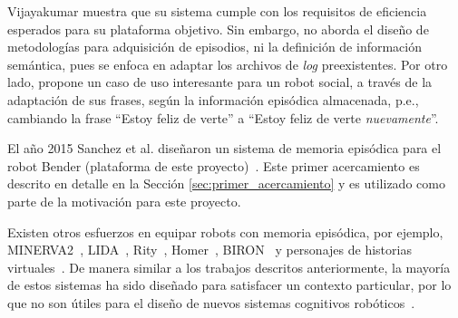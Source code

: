 Vijayakumar muestra que su sistema cumple con los requisitos de eficiencia esperados para su plataforma objetivo. Sin embargo, no aborda el diseño de metodologías para adquisición de episodios, ni la definición de información semántica, pues se enfoca en adaptar los archivos de \textit{log} preexistentes. Por otro lado, propone un caso de uso interesante para un robot social, a través de la adaptación de sus frases, según la información episódica almacenada, p.e., cambiando la frase ``Estoy feliz de verte'' a ``Estoy feliz de verte \textit{nuevamente}''. 


El año 2015 Sanchez et al. diseñaron un sistema de memoria episódica para el robot Bender (plataforma de este proyecto)~\cite{Sanchez:2015}. Este primer acercamiento es descrito en detalle en la Sección \ref{sec:primer_acercamiento} y es utilizado como parte de la motivación para este proyecto.


Existen otros esfuerzos en equipar robots con memoria episódica, por ejemplo, MINERVA2~\cite{Douglas1988}, LIDA~\cite{Feinstone2006}, Rity~\cite{Kuppuswamy2006}, Homer~\cite{Vere1990}, BIRON~\cite{Spexard2008} y personajes de historias virtuales~\cite{Brom2007}. De manera similar a los trabajos descritos anteriormente, la mayoría de estos sistemas ha sido diseñado para satisfacer un contexto particular, por lo que no son útiles para el diseño de nuevos sistemas cognitivos robóticos~\cite{Stachowicz2012}.







